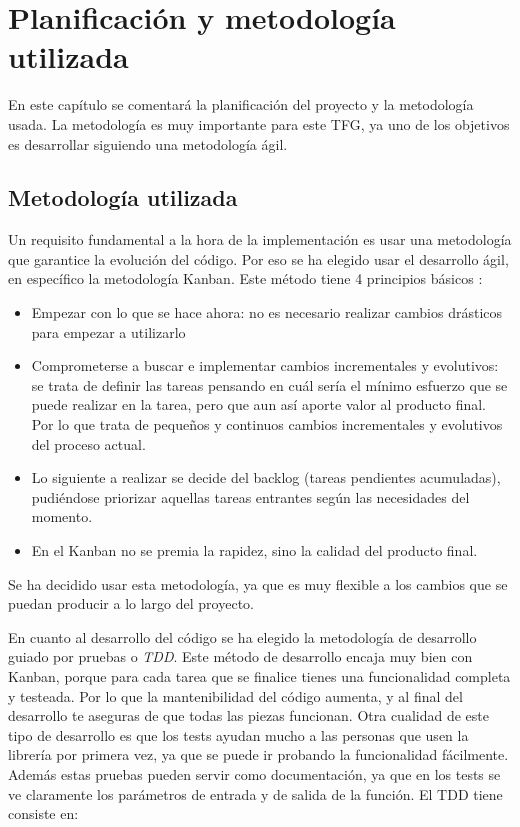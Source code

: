 \chapter{Planificación y metodología utilizada}

En este capítulo se comentará la planificación del proyecto y la metodología usada. La metodología
es muy importante para este TFG, ya uno de los objetivos es desarrollar siguiendo una metodología
ágil.

\section{Metodología utilizada}

Un requisito fundamental a la hora de la implementación es usar una metodología que garantice la evolución del código. Por eso se ha
elegido usar el desarrollo ágil, en específico la metodología Kanban. Este método tiene 4 principios básicos \cite{kanban}:

\begin{itemize}
    \item Empezar con lo que se hace ahora: no es necesario realizar cambios drásticos para empezar a utilizarlo
    \item Comprometerse a buscar e implementar cambios incrementales y evolutivos: se trata de definir las tareas
    pensando en cuál sería el mínimo esfuerzo que se puede realizar en la tarea, pero que aun así aporte valor al producto final.
    Por lo que trata de pequeños y continuos cambios incrementales y evolutivos del proceso actual.
    \item Lo siguiente a realizar se decide del backlog (tareas pendientes acumuladas), pudiéndose priorizar aquellas 
    tareas entrantes según las necesidades del momento.
    \item  En el Kanban no se premia la rapidez, sino la calidad del producto final.
\end{itemize}


Se ha decidido usar esta metodología, ya que es muy flexible a los cambios que se puedan producir a lo largo del proyecto.

En cuanto al desarrollo del código se ha elegido la metodología de desarrollo guiado por pruebas o \emph{TDD}. Este método
de desarrollo encaja muy bien con Kanban, porque para cada tarea que se finalice tienes una funcionalidad completa y testeada. Por
lo que la mantenibilidad del código aumenta, y al final del desarrollo te aseguras de que todas las piezas funcionan. Otra cualidad de
este tipo de desarrollo es que los tests ayudan mucho a las personas que usen la librería por primera vez, ya que se puede 
ir probando la funcionalidad fácilmente. Además estas pruebas pueden servir como documentación, ya que en los tests se ve claramente 
los parámetros de entrada y de salida de la función. El TDD tiene consiste en:

